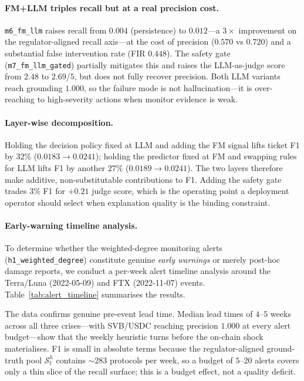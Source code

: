 \paragraph{FM+LLM triples recall but at a real precision cost.} \texttt{m6\_fm\_llm} raises recall from $0.004$ (persistence) to $0.012$---a $3\times$ improvement on the regulator-aligned recall axis---at the cost of precision ($0.570$ vs $0.720$) and a substantial false intervention rate (FIR $0.448$). The safety gate (\texttt{m7\_fm\_llm\_gated}) partially mitigates this and raises the LLM-as-judge score from $2.48$ to $2.69$/$5$, but does not fully recover precision. Both LLM variants reach grounding $1.000$, so the failure mode is not hallucination---it is over-reaching to high-severity actions when monitor evidence is weak.

\paragraph{Layer-wise decomposition.} Holding the decision policy fixed at LLM and adding the FM signal lifts ticket F1 by $32\%$ ($0.0183 \to 0.0241$); holding the predictor fixed at FM and swapping rules for LLM lifts F1 by another $27\%$ ($0.0189 \to 0.0241$). The two layers therefore make additive, non-substitutable contributions to F1. Adding the safety gate trades $3\%$ F1 for $+0.21$ judge score, which is the operating point a deployment operator should select when explanation quality is the binding constraint.

\paragraph{Early-warning timeline analysis.}
To determine whether the weighted-degree monitoring alerts (\texttt{h1\_weighted\_degree}) constitute genuine \emph{early warnings} or merely post-hoc damage reports, we conduct a per-week alert timeline analysis around the Terra/Luna (2022-05-09) and FTX (2022-11-07) events. Table~\ref{tab:alert_timeline} summarises the results.



The data confirms genuine pre-event lead time. Median lead times of $4$--$5$ weeks across all three crises---with SVB/USDC reaching precision $1.000$ at every alert budget---show that the weekly heuristic turns before the on-chain shock materialises. F1 is small in absolute terms because the regulator-aligned ground-truth pool $\mathcal{S}_t^h$ contains $\sim 283$ protocols per week, so a budget of $5$--$20$ alerts covers only a thin slice of the recall surface; this is a budget effect, not a quality deficit.

